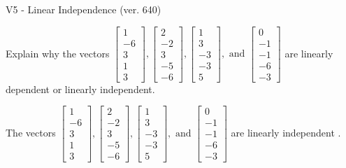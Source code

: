 \begin{exercise}
  \begin{exerciseTitle}V5 - Linear Independence (ver. 640)\end{exerciseTitle}
  \begin{exerciseStatement}
    Explain why the vectors \(\left[\begin{array}{r}
1 \\
-6 \\
3 \\
1 \\
3
\end{array}\right] , \left[\begin{array}{r}
2 \\
-2 \\
3 \\
-5 \\
-6
\end{array}\right] , \left[\begin{array}{r}
1 \\
3 \\
-3 \\
-3 \\
5
\end{array}\right] , \text{ and } \left[\begin{array}{r}
0 \\
-1 \\
-1 \\
-6 \\
-3
\end{array}\right]\) are linearly dependent or linearly independent.	


  \end{exerciseStatement}
  \begin{exerciseAnswer}
   The vectors \(\left[\begin{array}{r}
1 \\
-6 \\
3 \\
1 \\
3
\end{array}\right] , \left[\begin{array}{r}
2 \\
-2 \\
3 \\
-5 \\
-6
\end{array}\right] , \left[\begin{array}{r}
1 \\
3 \\
-3 \\
-3 \\
5
\end{array}\right] , \text{ and } \left[\begin{array}{r}
0 \\
-1 \\
-1 \\
-6 \\
-3
\end{array}\right]\) are 
  	 linearly independent  .
  


  \end{exerciseAnswer}
\end{exercise}